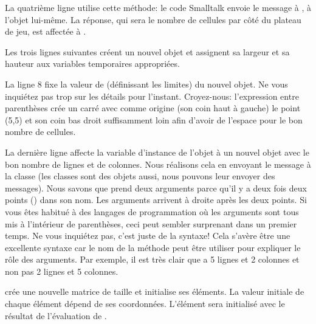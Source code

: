 \documentclass[a4paper,10pt,twoside]{book}
\begin{document}
La quatrième ligne utilise cette méthode: le code Smalltalk  envoie le message  à , \cad à l'objet lui-m\^eme. La réponse, qui sera le nombre de cellules par côté du plateau de jeu, est affectée à .

Les trois lignes suivantes créent un nouvel objet  et assignent sa largeur et sa hauteur aux variables temporaires appropriées.

La ligne 8 fixe la valeur de  (définissant les limites) du nouvel objet. Ne vous inquiétez pas trop sur les détails pour l'instant. Croyez-nous: l'expression entre parenthèses crée un carré avec comme origine (\ie son coin haut à gauche) le point (5,5) et son coin bas droit suffisamment loin afin d'avoir de l'espace pour le bon nombre de cellules.

La dernière ligne affecte la variable d'instance  de l'objet
 à un nouvel objet  avec le bon nombre de lignes et de colonnes.
Nous réalisons cela en envoyant le message  à la classe  (les classes sont des objets aussi, nous pouvons leur envoyer des messages).
Nous savons que  prend deux arguments parce qu'il y a deux fois deux points (\ct{:}) dans son nom. Les arguments arrivent à droite après les deux points.
Si vous \^etes habitué à des langages de programmation o\`u les arguments sont tous mis à l'intérieur de parenthèses, ceci peut sembler surprenant dans un premier temps. Ne vous inquiétez pas, c'est juste de la syntaxe!
Cela s'avère \^etre une excellente syntaxe car le nom de la méthode peut \^etre utiliser pour expliquer le rôle des arguments. Par exemple, il est très clair que  a 5 lignes et 2 colonnes et non pas 2 lignes et 5 colonnes.

 crée une nouvelle matrice de taille  et initialise ses éléments. La valeur initiale de chaque élément dépend de ses coordonnées. L'élément  sera initialisé avec le résultat de l'évaluation de .  
\end{document}
